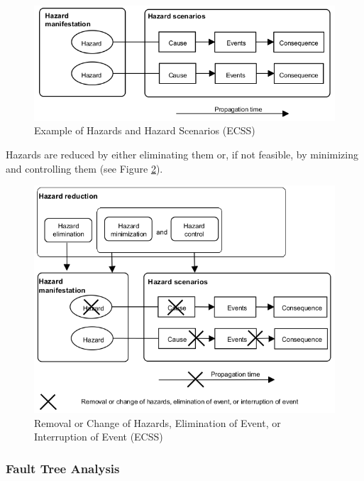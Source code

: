 \begin{figure}[h]
\centering\includegraphics[scale=0.6]{fig/example_of_hazards_and_hazard_scenarios}
\caption{Example of Hazards and Hazard Scenarios (ECSS)}
\label{fig:Example of Hazards and Hazard Scenarios}
\end{figure}

Hazards are reduced by either eliminating them or, if not feasible, by minimizing and controlling them (see Figure \ref{fig:Removal or Change of Hazards, Elimination of Event, or Interruption of Event}). 

\begin{figure}[h]
\centering\includegraphics[scale=0.6]{fig/removal_or_change_of_hazards}
\caption{Removal or Change of Hazards, Elimination of Event, or Interruption of Event (ECSS)}
\label{fig:Removal or Change of Hazards, Elimination of Event, or Interruption of Event}
\end{figure}

\subsubsection{Fault Tree Analysis}

